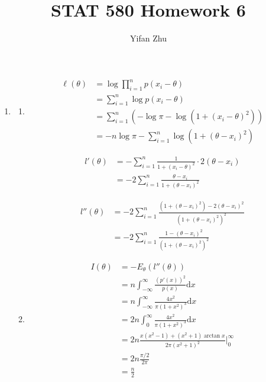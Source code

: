 \documentclass{article}
\begin{document}


	\title{STAT 580 Homework 6}
	\author{Yifan Zhu}
	\maketitle

	\begin{enumerate}[leftmargin = 0 em, label = \arabic*., font = \bfseries]
	\item
	\begin{enumerate}
		\item 
		\begin{align*}
	\ell (\theta) & = \log \prod_{i=1}^n p(x_i - \theta)\\
	& = \sum_{i=1}^n \log p(x_i - \theta)\\
	& = \sum_{i=1}^n \left( - \log \pi - \log(1 + (x_i - \theta)^2) \right)\\
	& =  -n \log \pi - \sum_{i=1}^{n} \log \left( 1 + (\theta - x_i)^2 \right) 
	\end{align*}

	\begin{align*}
	l'(\theta) & = - \sum_{i=1}^n \frac{1}{1 + (x_i - \theta)^2} \cdot 2 (\theta - x_i)\\
	& = - 2 \sum_{i=1}^n \frac{\theta - x_i}{1 + (\theta - x_i)^2}
	\end{align*}

	\begin{align*}
	l''(\theta) & = -2 \sum_{i=1}^n \frac{\left( 1 + (\theta - x_i)^2 \right) - 2 (\theta - x_i)^2 }{\left( 1 + (\theta - x_i)^2 \right)^2 }\\
	& = -2 \sum_{i=1}^n \frac{1 - (\theta - x_i)^2}{\left(1 + (\theta - x_i)^2\right)^2}
	\end{align*}
	\item 
	\begin{align*}
	I(\theta) & = - E_\theta (l''(\theta))\\
	& = n \int_{-\infty}^\infty \frac{(p'(x))^2}{p(x)} \mathrm{d}x\\
	& = n \int_{-\infty}^\infty \frac{4 x^2}{\pi (1 + x^2)^3} \mathrm{d}x\\
	& = 2n \int_0^\infty \frac{4 x^2}{\pi (1 + x^2)^3} \mathrm{d}x \\
	& = 2 n \frac{x (x^2 - 1) + (x^2 + 1) \arctan x}{2 \pi (x^2 + 1)^2} \bigg|_{0}^\infty\\
	& = 2 n \frac{\pi/2}{2 \pi} \\
	& = \frac{n}{2}
	\end{align*}


\end{enumerate}
\end{enumerate}
\end{document}
